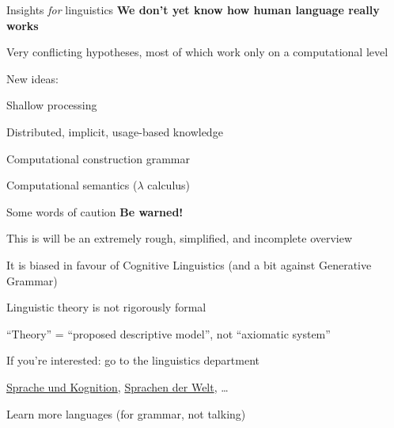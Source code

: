 \documentclass[aspectratio=169,cramped]{beamer}
\let\tempone\itemize
\let\temptwo\enditemize
\renewenvironment{itemize}{\tempone\addtolength{\itemsep}{-0\baselineskip}\addtolength{\parskip}{-0.2\baselineskip}}{\temptwo}
\begin{document}
\begin{frame}{Insights \textit{for} linguistics}
	\textbf{We don't yet know how human language really works}
	\begin{itemize}
  \item Very conflicting hypotheses, most of which work only on a computational level
  \item New ideas:
    \begin{itemize}
    \item Shallow processing
    \item Distributed, implicit, usage-based knowledge
    \item Computational construction grammar
    \item Computational semantics (\(\lambda\) calculus)
    \end{itemize}
  \end{itemize}
\end{frame}

\begin{frame}{Some words of caution}
  \textbf{Be warned!}
  \begin{itemize}
  \item This is will be an extremely rough, simplified, and incomplete overview
  \item It is biased in favour of Cognitive Linguistics (and a bit against Generative Grammar)
  \item Linguistic theory is not rigorously formal
    \begin{itemize}
    \item ``Theory'' = ``proposed descriptive model'', not ``axiomatic system''
    \end{itemize}
  \item If you're interested: go to the linguistics department
    \begin{itemize}
    \item
      \href{https://online.uni-graz.at/kfu_online/wbLv.wbShowLVDetail?pStpSpNr=584778}{Sprache und Kognition}, \href{https://online.uni-graz.at/kfu_online/wbLv.wbShowLVDetail?pStpSpNr=582944&pSpracheNr=1}{Sprachen
      der Welt}, \ldots
    \item Learn more languages (for grammar, not talking)
    \end{itemize}
  \end{itemize}
\end{frame}

\end{document}
